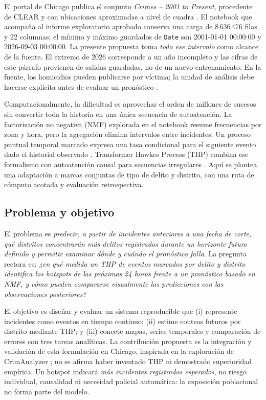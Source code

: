 \documentclass[10pt,a4paper,twocolumn]{article}
\newcommand{\campo}[1]{\texttt{#1}}
\begin{document}
El portal de Chicago publica el conjunto \emph{Crimes -- 2001 to Present}, procedente de CLEAR y con ubicaciones aproximadas a nivel de cuadra \cite{chicagoCrimes}. El notebook que acompaña al informe exploratorio aprobado \cite{neyra2026informe} conserva una carga de 8\,636\,476 filas y 22 columnas; el mínimo y máximo guardados de \campo{Date} son 2001-01-01 00:00:00 y 2026-09-03 00:00:00. La presente propuesta toma \emph{todo ese intervalo} como alcance de la fuente. El extremo de 2026 corresponde a un año incompleto y las cifras de este párrafo provienen de salidas guardadas, no de un nuevo entrenamiento. En la fuente, los homicidios pueden publicarse por víctima; la unidad de análisis debe hacerse explícita antes de evaluar un pronóstico \cite{chicagoCrimes}.

Computacionalmente, la dificultad es aprovechar el orden de millones de sucesos sin convertir toda la historia en una única secuencia de autoatención. La factorización no negativa (NMF) explorada en el notebook resume frecuencias por zona y hora, pero la agregación elimina intervalos entre incidentes. Un proceso puntual temporal marcado expresa una tasa condicional para el siguiente evento dado el historial observado \cite{rasmussen2018notes}. Transformer Hawkes Process (THP) combina ese formalismo con autoatención causal para secuencias irregulares \cite{zuo2020thp}. Aquí se plantea una adaptación a marcas conjuntas de tipo de delito y distrito, con una ruta de cómputo acotada y evaluación retrospectiva.

\subsection{Problema y objetivo}
El problema es \emph{predecir, a partir de incidentes anteriores a una fecha de corte, qué distritos concentrarán más delitos registrados durante un horizonte futuro definido y permitir examinar dónde y cuándo el pronóstico falla}. La pregunta rectora es: \emph{¿en qué medida un THP de eventos marcados por delito y distrito identifica los hotspots de las próximas 24 horas frente a un pronóstico basado en NMF, y cómo pueden compararse visualmente las predicciones con las observaciones posteriores?}

El objetivo es diseñar y evaluar un sistema reproducible que (i) represente incidentes como eventos en tiempo continuo; (ii) estime conteos futuros por distrito mediante THP; y (iii) conecte mapas, series temporales y comparación de errores con tres tareas analíticas. La contribución propuesta es la integración y validación de esta formulación en Chicago, inspirada en la exploración de CrimAnalyzer \cite{garcia2021crimanalyzer}; no se afirma haber inventado THP ni demostrado superioridad empírica. Un hotspot indicará \emph{más incidentes registrados esperados}, no riesgo individual, causalidad ni necesidad policial automática: la exposición poblacional no forma parte del modelo.
\end{document}
